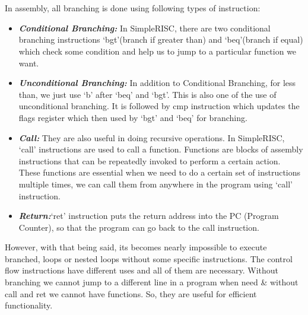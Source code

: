 \documentclass[12pt]{article}
\begin{document}
\section{}

In assembly, all branching is done using following types of instruction:
\begin{itemize}
    \item \textbf{\textit{Conditional Branching:}} In SimpleRISC, there are two conditional branching instructions ‘bgt’(branch if greater than) and ‘beq’(branch if equal) which check some condition and help us to jump to a particular function we want.
    \item \textbf{\textit{Unconditional Branching:}} In addition to Conditional Branching, for less than, we just use ‘b’ after ‘beq’ and ‘bgt’. This is also one of the use of unconditional branching. It is followed by cmp instruction which updates the flags register which then used by ‘bgt’ and ‘beq’ for branching. 
    \item \textbf{\textit{Call:}} They are also useful in doing recursive operations. In SimpleRISC, ‘call’ instructions are used to call a function. Functions are blocks of assembly instructions that can be repeatedly invoked to perform a certain action. These functions are essential when we need to do a certain set of instructions multiple times, we can call them from anywhere in the program using ‘call’ instruction. 
    \item \textbf{\textit{Return:}}‘ret’ instruction puts the return address into the PC (Program Counter), so that the program can go back to the call instruction.
\end{itemize}

However, with that being said, its becomes nearly impossible to execute branched, loops or nested loops without some specific instructions. The control flow instructions have different uses and all of them are necessary. Without branching we cannot jump to a different line in a program when need \& without call and ret we cannot have functions. So, they are useful for efficient functionality.
\end{document}
